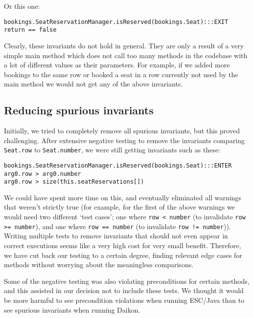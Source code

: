 \documentclass{article}
\begin{document}
Or this one:

\noindent
\begin{verbatim}
bookings.SeatReservationManager.isReserved(bookings.Seat):::EXIT
return == false
\end{verbatim}

Clearly, these invariants do not hold in general. They are only a result of a very simple main method which does not call too many methods in the codebase with a lot of different values as their parameters. For example, if we added more bookings to the same row or booked a seat in a row currently not used by the main method we would not get any of the above invariants.

\subsection{Reducing spurious invariants}

Initially, we tried to completely remove all spurious invariants, but this proved challenging. After extensive negative testing to remove the invariants comparing \verb|Seat.row| to \verb|Seat.number|, we were still getting invariants such as these:

\noindent
\begin{verbatim}
bookings.SeatReservationManager.isReserved(bookings.Seat):::ENTER
arg0.row > arg0.number
arg0.row > size(this.seatReservations[])
\end{verbatim}

We could have spent more time on this, and eventually eliminated all warnings that weren't strictly true (for example, for the first of the above warnings we would need two different `test cases'; one where \verb|row < number| (to invalidate \verb|row >= number|), and one where \verb|row == number| (to invalidate \verb|row != number|)). Writing multiple tests to remove invariants that should not even appear in correct executions seems like a very high cost for very small benefit. Therefore, we have cut back our testing to a certain degree, finding relevant edge cases for methods without worrying about the meaningless comparisons.

Some of the negative testing was also violating preconditions for certain methods, and this assisted in our decision not to include these tests. We thought it would be more harmful to see precondition violations when running ESC/Java than to see spurious invariants when running Daikon.
\end{document}
